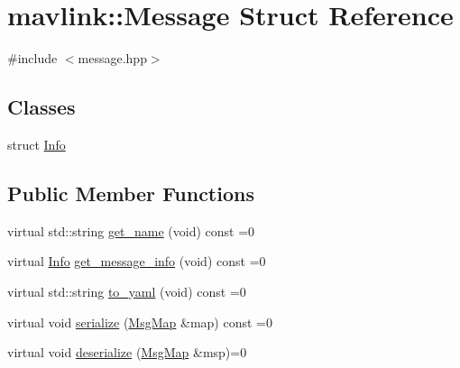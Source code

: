 \hypertarget{structmavlink_1_1Message}{}\section{mavlink\+::Message Struct Reference}
\label{structmavlink_1_1Message}


{\ttfamily \#include $<$message.\+hpp$>$}

\subsection*{Classes}
\begin{DoxyCompactItemize}
\item 
struct \mbox{\hyperlink{structmavlink_1_1Message_1_1Info}{Info}}
\end{DoxyCompactItemize}
\subsection*{Public Member Functions}
\begin{DoxyCompactItemize}
\item 
virtual std\+::string \mbox{\hyperlink{structmavlink_1_1Message_acfcd821ce25f7e4e2633f44d4a57b185}{get\+\_\+name}} (void) const =0
\item 
virtual \mbox{\hyperlink{structmavlink_1_1Message_1_1Info}{Info}} \mbox{\hyperlink{structmavlink_1_1Message_abf1ca05ae7564100d52b04473a784d1c}{get\+\_\+message\+\_\+info}} (void) const =0
\item 
virtual std\+::string \mbox{\hyperlink{structmavlink_1_1Message_a6a2a01c5fdb6e6039a89f43923085e81}{to\+\_\+yaml}} (void) const =0
\item 
virtual void \mbox{\hyperlink{structmavlink_1_1Message_a8aebc1882e5e4b7838909b5fdd56ef1d}{serialize}} (\mbox{\hyperlink{classmavlink_1_1MsgMap}{Msg\+Map}} \&map) const =0
\item 
virtual void \mbox{\hyperlink{structmavlink_1_1Message_a082824377e57f4e90bce4cba1a44f90b}{deserialize}} (\mbox{\hyperlink{classmavlink_1_1MsgMap}{Msg\+Map}} \&msp)=0
\end{DoxyCompactItemize}
